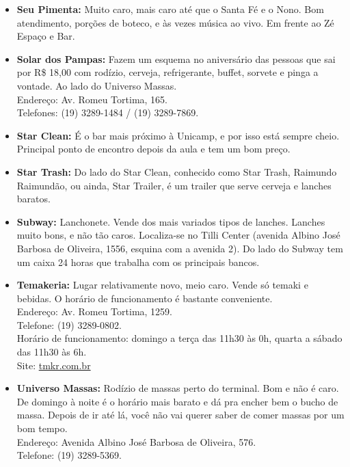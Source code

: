 \begin{itemize}
\item   \textbf{Seu Pimenta:} Muito caro, mais caro até que o Santa Fé e o Nono.
        Bom atendimento, porções de boteco, e às vezes música ao vivo. Em frente
        ao Zé Espaço e Bar.

\item   \textbf{Solar dos Pampas:} Fazem um esquema no aniversário das pessoas
        que sai por R\$ 18,00 com rodízio, cerveja, refrigerante, buffet,
        sorvete e pinga a vontade. Ao lado do Universo Massas.
        \\Endereço: Av. Romeu Tortima, 165.
        \\Telefones: (19) 3289-1484 / (19) 3289-7869.

\item   \textbf{Star Clean:} É o bar mais próximo à Unicamp, e por isso está
        sempre cheio. Principal ponto de encontro depois da aula e tem um bom
        preço.

\item   \textbf{Star Trash:} Do lado do Star Clean, conhecido como Star Trash,
        Raimundo Raimundão, ou ainda, Star Trailer, é um trailer que serve
        cerveja e lanches baratos.

\item   \textbf{Subway:} Lanchonete. Vende dos mais variados tipos de lanches.
        Lanches muito bons, e não tão caros. Localiza-se no Tilli Center
        (avenida Albino José Barbosa de Oliveira, 1556, esquina com a avenida
        2). Do lado do Subway tem um caixa 24 horas que trabalha com os
        principais bancos.

\item   \textbf{Temakeria:} Lugar relativamente novo, meio caro. Vende só temaki
        e bebidas. O horário de funcionamento é bastante conveniente.
        \\Endereço: Av. Romeu Tortima, 1259.
        \\Telefone: (19) 3289-0802.
        \\Horário de funcionamento: domingo a terça das 11h30 às 0h, quarta a
        sábado das 11h30 às 6h.
        \\Site: \url{tmkr.com.br}

\item   \textbf{Universo Massas:} Rodízio de massas perto do terminal. Bom e não
        é caro. De domingo à noite é o horário mais barato e dá pra encher bem o
        bucho de massa. Depois de ir até lá, você não vai querer saber de comer
        massas por um bom tempo.
        \\Endereço: Avenida Albino José Barbosa de Oliveira, 576.
        \\Telefone: (19) 3289-5369.


\end{itemize}
